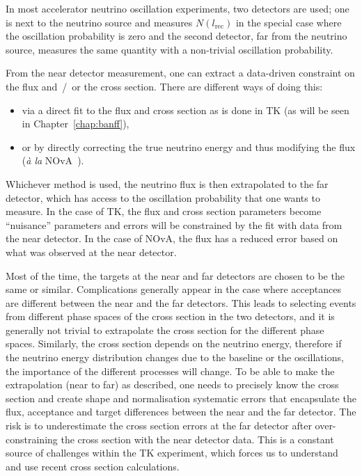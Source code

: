 In most accelerator neutrino oscillation experiments, two detectors
are used; one is next to the neutrino source and measures
$N(l_\text{rec})$ in the special case where the oscillation
probability is zero and the second detector, far from the neutrino
source, measures the same quantity with a non-trivial oscillation
probability.

From the near detector measurement, one can extract a data-driven
constraint on the flux and~/~or the cross section. There are different
ways of doing this:
\begin{itemize}[noitemsep,topsep=0pt]
\item via a direct fit to the flux and cross section as
  is done in \Gls{TK} (as will be seen in Chapter~\ref{chap:banff}),
\item or by directly correcting the true neutrino energy and thus
  modifying the flux ({\it \`a la}
  \Gls{NOvA}~\cite{PhysRevLett.118.231801}).
\end{itemize}

Whichever method is used, the neutrino flux is then extrapolated to
the far detector, which has access to the oscillation probability that
one wants to measure. In the case of \Gls{TK}, the flux and cross
section parameters become ``nuisance'' parameters and errors will be
constrained by the fit with data from the near detector. In the case
of \Gls{NOvA}, the flux has a reduced error based on what was observed
at the near detector.

Most of the time, the targets at the near and far detectors are chosen
to be the same or similar. Complications generally appear in the case
where acceptances are different between the near and the far
detectors. This leads to selecting events from different phase spaces
of the cross section in the two detectors, and it is generally not
trivial to extrapolate the cross section for the different phase
spaces. Similarly, the cross section depends on the neutrino energy,
therefore if the neutrino energy distribution changes due to the
baseline or the oscillations, the importance of the different
processes will change. To be able to make the extrapolation (near to
far) as described, one needs to precisely know the cross section and
create shape and normalisation systematic errors that encapsulate the
flux, acceptance and target differences between the near and the far
detector. The risk is to underestimate the cross section errors at the
far detector after over-constraining the cross section with the near
detector data. This is a constant source of challenges within the
\Gls{TK} experiment, which forces us to understand and use recent
cross section calculations.

